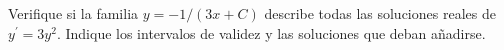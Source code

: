 Verifique si la familia $y=-1/(3x+C)$ describe todas las soluciones reales de $y^{\prime}=3y^2$. Indique los intervalos de validez y las soluciones que deban añadirse.
